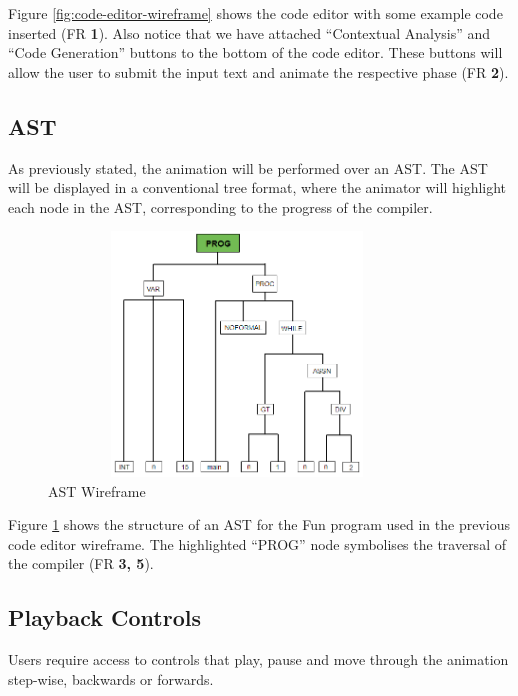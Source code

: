 \documentclass{l4proj}
\begin{document}
Figure \ref{fig:code-editor-wireframe} shows the code editor with some example code inserted (FR \textbf{1}). Also notice that we have attached ``Contextual Analysis'' and ``Code Generation'' buttons to the bottom of the code editor. These buttons will allow the user to submit the input text and animate the respective phase (FR \textbf{2}).

\subsection{AST}
As previously stated, the animation will be performed over an AST. The AST will be displayed in a conventional tree format, where the animator will highlight each node in the AST, corresponding to the progress of the compiler.

\begin{figure}[h]
\centering
\includegraphics[height=6.5cm,width=10cm]{images/animation-active-wireframe.png}
\caption{AST Wireframe}
\label{fig:animation-active-wireframe}	
\end{figure}

Figure \ref{fig:animation-active-wireframe} shows the structure of an AST for the Fun program used in the previous code editor wireframe. The highlighted ``PROG'' node symbolises the traversal of the compiler (FR \textbf{3, 5}).

\subsection{Playback Controls}
Users require access to controls that play, pause and move through the animation step-wise, backwards or forwards. 
\end{document}
